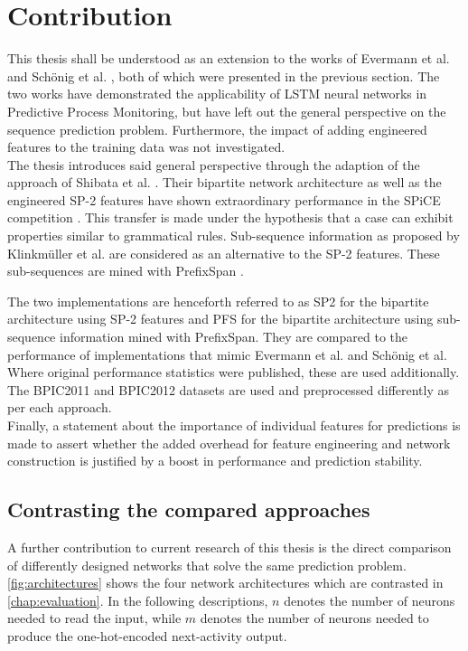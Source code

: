 \chapter{Contribution}\label{sec:contribution}

This thesis shall be understood as an extension to the works of Evermann et al. \cite{evermann2016} and Schönig et al. \cite{schoenig2018}, both of which were presented in the previous section. The two works have demonstrated the applicability of LSTM neural networks in Predictive Process Monitoring, but have left out the general perspective on the sequence prediction problem. Furthermore, the impact of adding engineered features to the training data was not investigated.\\

The thesis introduces said general perspective through the adaption of the approach of Shibata et al. \cite{shibata2016bipartite}. Their bipartite network architecture as well as the engineered SP-2 features have shown extraordinary performance in the SPiCE competition \cite{web:spice}. This transfer is made under the hypothesis that a case can exhibit properties similar to grammatical rules. Sub-sequence information as proposed by Klinkmüller et al. \cite{klinkmuller2018reliablemonitoring} are considered as an alternative to the SP-2 features. These sub-sequences are mined with PrefixSpan \cite{pei2001prefixspan}.

The two implementations are henceforth referred to as SP2 for the bipartite architecture using SP-2 features and PFS for the bipartite architecture using sub-sequence information mined with PrefixSpan. They are compared to the performance of implementations that mimic Evermann et al. and Schönig et al. Where original performance statistics were published, these are used additionally. The BPIC2011 \cite{BPIC2011} and BPIC2012 \cite{BPIC2012} datasets are used and preprocessed differently as per each approach.\\

Finally, a statement about the importance of individual features for predictions is made to assert whether the added overhead for feature engineering and network construction is justified by a boost in performance and prediction stability.

\section{Contrasting the compared approaches}
A further contribution to current research of this thesis is the direct comparison of differently designed networks that solve the same prediction problem. \autoref{fig:architectures} shows the four network architectures which are contrasted in \autoref{chap:evaluation}. In the following descriptions, $n$ denotes the number of neurons needed to read the input, while $m$ denotes the number of neurons needed to produce the one-hot-encoded next-activity output.\\

